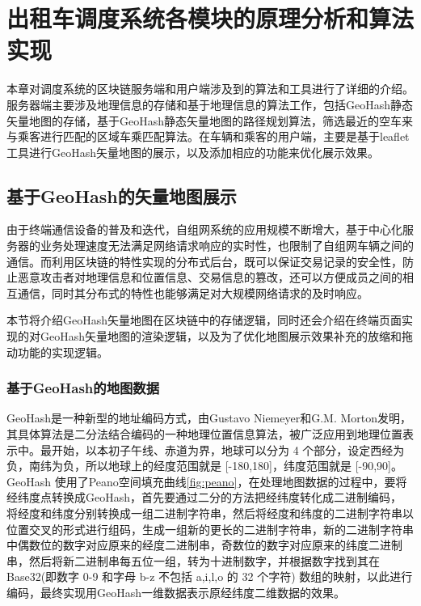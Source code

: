 \chapter{出租车调度系统各模块的原理分析和算法实现}

本章对调度系统的区块链服务端和用户端涉及到的算法和工具进行了详细的介绍。服务器端主要涉及地理信息的存储和基于地理信息的算法工作，包括GeoHash静态矢量地图的存储，基于GeoHash静态矢量地图的路径规划算法，筛选最近的空车来与乘客进行匹配的区域车乘匹配算法。在车辆和乘客的用户端，主要是基于leaflet工具进行GeoHash矢量地图的展示，以及添加相应的功能来优化展示效果。

\section{基于GeoHash的矢量地图展示}

由于终端通信设备的普及和迭代，自组网系统的应用规模不断增大，基于中心化服务器的业务处理速度无法满足网络请求响应的实时性，也限制了自组网车辆之间的通信。而利用区块链的特性实现的分布式后台，既可以保证交易记录的安全性，防止恶意攻击者对地理信息和位置信息、交易信息的篡改，还可以方便成员之间的相互通信，同时其分布式的特性也能够满足对大规模网络请求的及时响应。

本节将介绍GeoHash矢量地图在区块链中的存储逻辑，同时还会介绍在终端页面实现的对GeoHash矢量地图的渲染逻辑，以及为了优化地图展示效果补充的放缩和拖动功能的实现逻辑。

\subsection{基于GeoHash的地图数据}

GeoHash是一种新型的地址编码方式，由Gustavo Niemeyer和G.M. Morton发明，其具体算法是二分法结合编码的一种地理位置信息算法，被广泛应用到地理位置表示中。最开始，以本初子午线、赤道为界，地球可以分为 4 个部分，设定西经为负，南纬为负，所以地球上的经度范围就是 [-180,180]，纬度范围就是 [-90,90]。GeoHash 使用了Peano空间填充曲线\ref{fig:peano}，在处理地图数据的过程中，要将经纬度点转换成GeoHash，首先要通过二分的方法把经纬度转化成二进制编码，
将经度和纬度分别转换成一组二进制字符串，然后将经度和纬度的二进制字符串以位置交叉的形式进行组码，生成一组新的更长的二进制字符串，新的二进制字符串中偶数位的数字对应原来的经度二进制串，奇数位的数字对应原来的纬度二进制串，然后将新二进制串每五位一组，转为十进制数字，并根据数字找到其在Base32(即数字 0-9 和字母 b-z 不包括 a,i,l,o 的 32 个字符) 数组的映射，以此进行编码，最终实现用GeoHash一维数据表示原经纬度二维数据的效果。

